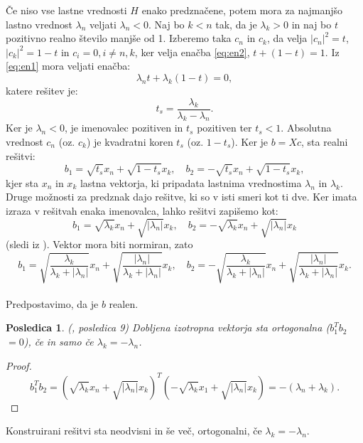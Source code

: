 \documentclass[12pt,a4paper]{amsart}
\theoremstyle{definition}
\theoremstyle{plain}
\newtheorem{posledica}[definicija]{Posledica}
\newcommand{\abs}[1]{ \left\lvert#1\right\rvert}
\begin{document}
Če niso vse lastne vrednosti $H$ enako predznačene, potem mora za najmanjšo lastno vrednost $\lambda_n$ veljati $\lambda_n <0$. 
Naj bo $k<n$ tak, da je $\lambda_k >0$ in naj bo $t$ pozitivno realno število manjše od 1.  Izberemo taka $c_n$ in $c_k$, da velja  $\abs{c_n}^2 =t$, $\abs{c_k}^2=1-t$ in $c_i =0, i\not=n,k$, ker velja enačba \eqref{eq:en2}, $t+ (1-t)=1$. Iz \eqref{eq:en1} mora veljati enačba: $$\lambda_n t +\lambda_k (1-t)=0,$$ katere rešitev je:
\begin{equation}
t_s=\frac{\lambda_k}{\lambda_k -\lambda_n}.
\end{equation}
Ker je $\lambda_n <0$, je imenovalec pozitiven in $t_s$ pozitiven ter $t_s <1$. Absolutna vrednost $c_n$ (oz. $c_k$) je kvadratni koren $t_s$ (oz. $1-t_s$). Ker je $b=Xc$, sta realni rešitvi: $$b_1=\sqrt{t_s}x_n +\sqrt{1-t_s}x_k,\quad b_2=-\sqrt{t_s}x_n+\sqrt{1-t_s}x_k,$$ kjer sta $x_n$ in $x_k$ lastna vektorja, ki pripadata lastnima vrednostima $\lambda_n$ in $\lambda_k$. Druge možnosti za predznak dajo rešitve, ki so v isti smeri kot ti dve. Ker imata izraza v rešitvah enaka imenovalca, lahko rešitvi zapišemo kot: $$b_1=\sqrt{\lambda_k}x_n+\sqrt{\abs{\lambda_n}}x_k, \quad b_2=-\sqrt{\lambda_k}x_n+\sqrt{\abs{\lambda_n}}x_k$$(sledi iz \cite{lipkin}).  Vektor mora biti normiran, zato
 $$b_1=\sqrt{\frac{\lambda_k}{\lambda_k +\abs{\lambda_n}}}x_n + \sqrt{\frac{\abs{\lambda_n}}{\lambda_k +\abs{\lambda_n}}}x_k,\quad b_2=-\sqrt{\frac{\lambda_k}{\lambda_k +\abs{\lambda_n}}}x_n + \sqrt{\frac{\abs{\lambda_n}}{\lambda_k +\abs{\lambda_n}}}x_k.$$ \\%

Predpostavimo, da je $b$ realen.
\begin{posledica}(\cite{lipkin}, posledica 9)
Dobljena izotropna vektorja sta ortogonalna ($b_1 ^T b_2$ $=0$), če in samo če $\lambda_k=-\lambda_n$.
\end{posledica}
\begin{proof}%
$$b_1 ^T b_2=(\sqrt{\lambda_k}x_n+\sqrt{\abs{\lambda_n}}x_k)^T (-\sqrt{\lambda_k}x_1+\sqrt{\abs{\lambda_n}}x_k )= -(\lambda_n +\lambda_k).$$
\end{proof} 
Konstruirani rešitvi sta neodvisni in še več, ortogonalni, če $\lambda_k =-\lambda_n$. \\
\end{document}
